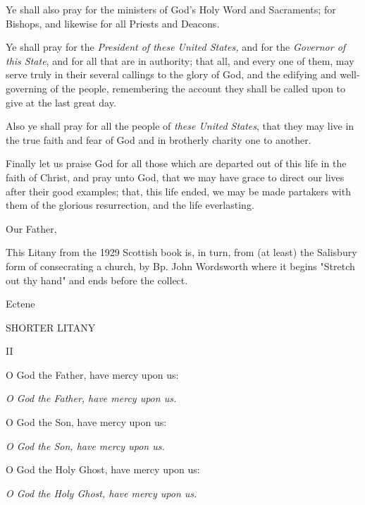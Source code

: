 Ye shall also pray for the ministers of God’s Holy Word and Sacraments; for Bishops, and likewise for all Priests and Deacons.

Ye shall pray for the \emph{President of these United States,} and for the \emph{Governor of this State}, and for all that are in authority; that all, and every one of them, may serve truly in their several callings to the glory of God, and the edifying and well-governing of the people, remembering the account they shall be called upon to give at the last great day.

Also ye shall pray for all the people of \emph{these United States}, that they may live in the true faith and fear of God and in brotherly charity one to another.

Finally let us praise God for all those which are departed out of this life in the faith of Christ,  and pray unto God, that we may have grace to direct our lives after their good examples; that, this life ended, we may be made partakers with them of the glorious resurrection, and the life everlasting.

\centerline{Our Father, \etc}




\bigskip
This Litany from the 1929 Scottish book is, in turn, from (at least)
the Salisbury form of consecrating a church, by Bp. John Wordsworth where it begins "Stretch out thy hand" and ends before the collect.

Ectene

SHORTER LITANY

II

 


\smallskip
O God the Father, have mercy upon us:
    
\hspace{\parindent}\emph{O God the Father, have mercy upon us.}

\smallskip
O God the Son, have mercy upon us:

\hspace{\parindent}\emph{O God the Son, have mercy upon us.}

\smallskip
O God the Holy Ghost, have mercy upon us:

\hspace{\parindent}\emph{O God the Holy Ghost, have mercy upon us.}


